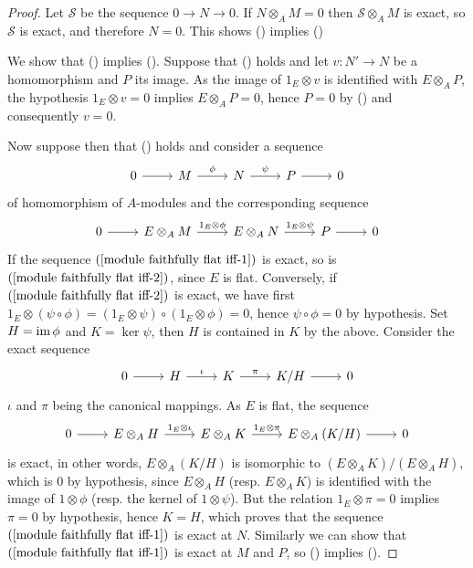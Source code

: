 \begin{proof}
Let $\mathscr{S}$ be the sequence $0\to N\to 0$. If $N\otimes_AM=0$ then $\mathscr{S}\otimes_AM$ is exact, so $\mathscr{S}$ is exact, and therefore $N=0$. This shows () implies ()\par
We show that () implies (). Suppose that () holds and let $v:N'\to N$ be a homomorphism and $P$ its image. As the image of $1_E\otimes v$ is identified with $E\otimes_AP$, the hypothesis $1_E\otimes v=0$ implies $E\otimes_AP=0$, hence $P=0$ by () and consequently $v=0$.\par
Now suppose then that () holds and consider a sequence
\begin{equation}\label{module faithfully flat iff-1}
\begin{tikzcd}
0\ar[r]&M\ar[r,"\phi"]&N\ar[r,"\psi"]&P\ar[r]&0
\end{tikzcd}
\end{equation}
of homomorphism of $A$-modules and the corresponding sequence
\begin{equation}\label{module faithfully flat iff-2}
\begin{tikzcd}
0\ar[r]&E\otimes_AM\ar[r,"1_E\otimes\phi"]&E\otimes_AN\ar[r,"1_E\otimes\psi"]&P\ar[r]&0
\end{tikzcd}
\end{equation}
If the sequence $(\ref{module faithfully flat iff-1})$ is exact, so is $(\ref{module faithfully flat iff-2})$, since $E$ is flat. Conversely, if $(\ref{module faithfully flat iff-2})$ is exact, we have first $1_E\otimes(\psi\circ\phi)=(1_E\otimes\psi)\circ(1_E\otimes\phi)=0$, hence $\psi\circ\phi=0$ by hypothesis. Set $H=\operatorname{im}\phi$ and $K=\ker\psi$, then $H$ is contained in $K$ by the above. Consider the exact sequence
\[\begin{tikzcd}
0\ar[r]&H\ar[r,"\iota"]&K\ar[r,"\pi"]&K/H\ar[r]&0
\end{tikzcd}\]
$\iota$ and $\pi$ being the canonical mappings. As $E$ is flat, the sequence
\[\begin{tikzcd}
0\ar[r]&E\otimes_AH\ar[r,"1_E\otimes\iota"]&E\otimes_AK\ar[r,"1_E\otimes\pi"]&E\otimes_A(K/H)\ar[r]&0
\end{tikzcd}\]
is exact, in other words, $E\otimes_A(K/H)$ is isomorphic to $(E\otimes_AK)/(E\otimes_AH)$, which is $0$ by hypothesis, since $E\otimes_AH$ (resp. $E\otimes_AK$) is identified with the image of $1\otimes\phi$ (resp. the kernel of $1\otimes\psi$). But the relation $1_E\otimes\pi=0$ implies $\pi=0$ by hypothesis, hence $K=H$, which proves that the sequence $(\ref{module faithfully flat iff-1})$ is exact at $N$. Similarly we can show that $(\ref{module faithfully flat iff-1})$ is exact at $M$ and $P$, so () implies ().\par

\end{proof}
